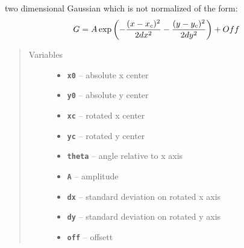 \documentclass[letterpaper,10pt,english]{sphinxmanual}
\begin{document}
\begin{fulllineitems}
\begin{fulllineitems}
\label{fit_object:Fitobject.fit_object.gauss_2D}
two dimensional Gaussian which is not normalized of the form:
\begin{gather}
\begin{split}G = A \exp\left(-\frac{(x-x_c)^2}{2dx^2}- \frac{(y-y_c)^2}{2dy^2}\right)+ Off\end{split}\notag
\end{gather}\begin{quote}\begin{description}
\item[{Variables}] \leavevmode\begin{itemize}
\item {} 
\textbf{\texttt{x0}} -- absolute x center

\item {} 
\textbf{\texttt{y0}} -- absolute y center

\item {} 
\textbf{\texttt{xc}} -- rotated x center

\item {} 
\textbf{\texttt{yc}} -- rotated y center

\item {} 
\textbf{\texttt{theta}} -- angle relative to x axis

\item {} 
\textbf{\texttt{A}} -- amplitude

\item {} 
\textbf{\texttt{dx}} -- standard deviation on rotated x axis

\item {} 
\textbf{\texttt{dy}} -- standard deviation on rotated y axis

\item {} 
\textbf{\texttt{off}} -- offsett

\end{itemize}

\end{description}\end{quote}

\end{fulllineitems}



\end{fulllineitems}
\end{document}
